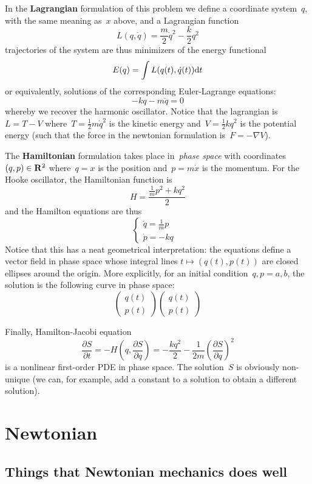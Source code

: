 In the {\bf Lagrangian} formulation of this problem we define a coordinate
system~$q$, with the same meaning as~$x$ above, and a Lagrangian function
\[
	L(q,\dot q) = \frac m2\dot q^2-\frac k2q^2
\]
trajectories of the system are thus minimizers of the energy functional
\[
	E(q) = \int L(q(t), \dot q(t))\mathrm{d} t
\]
or equivalently, solutions of the corresponding Euler-Lagrange equations:
\[
	-kq - m\ddot q = 0
\]
whereby we recover the harmonic oscillator.
Notice that the lagrangian is~$L=T-V$ where~$T=\frac12m\dot q^2$ is the
kinetic energy and~$V=\frac12kq^2$ is the potential energy (such that the
force in the newtonian formulation is~$F=-\nabla V$).

The {\bf Hamiltonian} formulation takes place in~\emph{phase space} with
coordinates~$(q,p)\in\mathbf{R}^2$ where~$q=x$ is the position and~$p=m\dot x$ is the
momentum.  For the Hooke oscillator, the Hamiltonian function is
\[
	H = \frac{\tfrac1mp^2 + kq^2}2
\]
and the Hamilton equations are thus
\[
	\begin{cases}
	\dot q = \tfrac1mp & \\
	\dot p = -kq
	\end{cases}
\]
Notice that this has a neat geometrical interpretation: the equations define
a vector field in phase space whose integral lines $t\mapsto(q(t),p(t))$ are
closed ellipses around the origin.  More explicitly, for an initial
condition~$q,p=a,b$, the solution is the following curve in phase space:
\[
	\begin{pmatrix}
		q(t) \\
		p(t)
	\end{pmatrix}
	\begin{pmatrix}
		q(t) \\
		p(t)
	\end{pmatrix}
\]

Finally, Hamilton-Jacobi equation
\[
	\frac{\partial S}{\partial t}
	=
	-H\left(q, \frac{\partial S}{\partial q}\right)
	=
	-\frac{kq^2}2
	-\frac 1{2m}\left(\frac{\partial S}{\partial q}\right)^2
\]
is a nonlinear first-order PDE in phase space.  The solution~$S$ is obviously
non-unique (we can, for example, add a constant to a solution to obtain a
different solution).



\section{Newtonian}

\subsection{Things that Newtonian mechanics does well}

